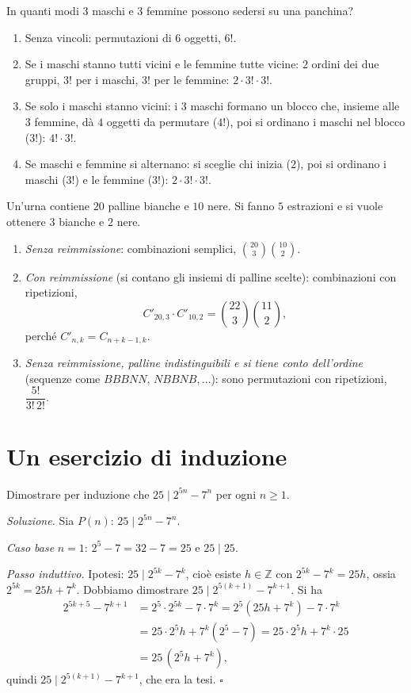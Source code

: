 \documentclass[11pt,a4paper]{article}
\begin{document}
\begin{esempio}[Panchina]
In quanti modi $3$ maschi e $3$ femmine possono sedersi su una panchina?
\begin{enumerate}
    \item Senza vincoli: permutazioni di $6$ oggetti, $6!$.
    \item Se i maschi stanno tutti vicini e le femmine tutte vicine: $2$ ordini dei due gruppi, $3!$ per i maschi, $3!$ per le femmine: $2 \cdot 3! \cdot 3!$.
    \item Se solo i maschi stanno vicini: i $3$ maschi formano un blocco che, insieme alle $3$ femmine, dà $4$ oggetti da permutare ($4!$), poi si ordinano i maschi nel blocco ($3!$): $4! \cdot 3!$.
    \item Se maschi e femmine si alternano: si sceglie chi inizia ($2$), poi si ordinano i maschi ($3!$) e le femmine ($3!$): $2 \cdot 3! \cdot 3!$.
\end{enumerate}
\end{esempio}

\begin{esempio}[Urna]
Un'urna contiene $20$ palline bianche e $10$ nere. Si fanno $5$ estrazioni e si vuole ottenere $3$ bianche e $2$ nere.
\begin{enumerate}
    \item \emph{Senza reimmissione}: combinazioni semplici, $\binom{20}{3}\binom{10}{2}$.
    \item \emph{Con reimmissione} (si contano gli insiemi di palline scelte): combinazioni con ripetizioni,
    \[
    C'_{20,3}\cdot C'_{10,2} = \binom{22}{3}\binom{11}{2},
    \]
    perché $C'_{n,k} = C_{n+k-1,k}$.
    \item \emph{Senza reimmissione, palline indistinguibili e si tiene conto dell'ordine} (sequenze come $BBBNN$, $NBBNB, \dots$): sono permutazioni con ripetizioni, $\dfrac{5!}{3!\,2!}$.
\end{enumerate}
\end{esempio}

\section{Un esercizio di induzione}

\begin{esercizio}
Dimostrare per induzione che $25 \mid 2^{5n} - 7^n$ per ogni $n \ge 1$.
\end{esercizio}

\emph{Soluzione.} Sia $P(n)$: $25 \mid 2^{5n} - 7^n$.

\emph{Caso base} $n = 1$: $2^5 - 7 = 32 - 7 = 25$ e $25 \mid 25$.

\emph{Passo induttivo.} Ipotesi: $25 \mid 2^{5k} - 7^k$, cioè esiste $h \in \mathbb{Z}$ con $2^{5k} - 7^k = 25h$, ossia $2^{5k} = 25h + 7^k$. Dobbiamo dimostrare $25 \mid 2^{5(k+1)} - 7^{k+1}$. Si ha
\begin{align*}
2^{5k+5} - 7^{k+1} &= 2^5 \cdot 2^{5k} - 7 \cdot 7^k = 2^5 (25h + 7^k) - 7 \cdot 7^k \\
&= 25 \cdot 2^5 h + 7^k (2^5 - 7) = 25 \cdot 2^5 h + 7^k \cdot 25 \\
&= 25\,(2^5 h + 7^k),
\end{align*}
quindi $25 \mid 2^{5(k+1)} - 7^{k+1}$, che era la tesi. \hfill $\square$
\end{document}
